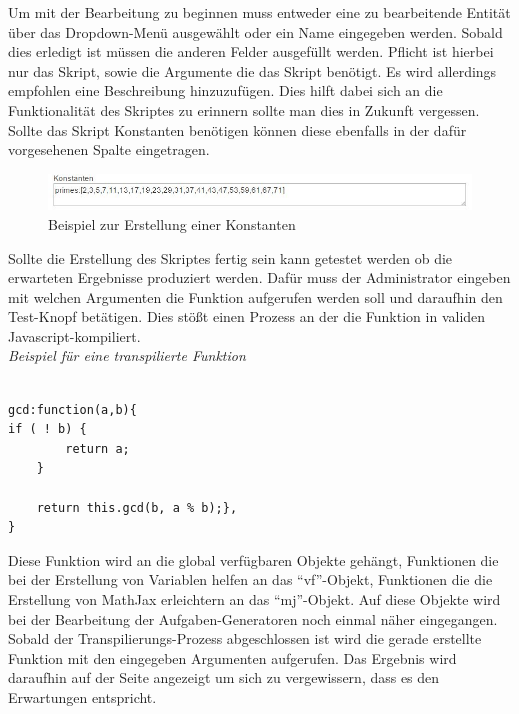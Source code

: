 Um mit der Bearbeitung zu beginnen muss entweder eine zu bearbeitende Entität über das Dropdown-Menü ausgewählt oder ein Name eingegeben werden. Sobald dies erledigt ist müssen die anderen Felder ausgefüllt werden. Pflicht ist hierbei nur das Skript, sowie die Argumente die das Skript benötigt. Es wird allerdings empfohlen eine Beschreibung hinzuzufügen. Dies hilft dabei sich an die Funktionalität des Skriptes zu erinnern sollte man dies in Zukunft vergessen. \\

Sollte das Skript Konstanten benötigen können diese ebenfalls in der dafür vorgesehenen Spalte eingetragen. 

\begin{figure}[htp]     %
\centering
\includegraphics[width=1\textwidth]{bilder/ConstantExample} 
\caption[Beispiel zur Erstellung einer Konstanten]{Beispiel zur Erstellung einer Konstanten}
\end{figure} 

Sollte die Erstellung des Skriptes fertig sein kann getestet werden ob die erwarteten Ergebnisse produziert werden. Dafür muss der Administrator eingeben mit welchen Argumenten die Funktion aufgerufen werden soll und daraufhin den Test-Knopf betätigen. Dies stößt einen Prozess an der die Funktion in validen Javascript-kompiliert. \\

\emph{Beispiel für eine transpilierte Funktion}
\begin{lstlisting}

gcd:function(a,b){
if ( ! b) {
        return a;
    }

    return this.gcd(b, a % b);}, 
}
\end{lstlisting}

Diese Funktion wird an die global verfügbaren Objekte gehängt, Funktionen die bei der Erstellung von Variablen helfen an das ``vf''-Objekt, Funktionen die die Erstellung von MathJax erleichtern an das ``mj''-Objekt. Auf diese Objekte wird bei der Bearbeitung der Aufgaben-Generatoren noch einmal näher eingegangen. \\

Sobald der Transpilierungs-Prozess abgeschlossen ist wird die gerade erstellte Funktion mit den eingegeben Argumenten aufgerufen. Das Ergebnis wird daraufhin auf der Seite angezeigt um sich zu vergewissern, dass es den Erwartungen entspricht. \\

